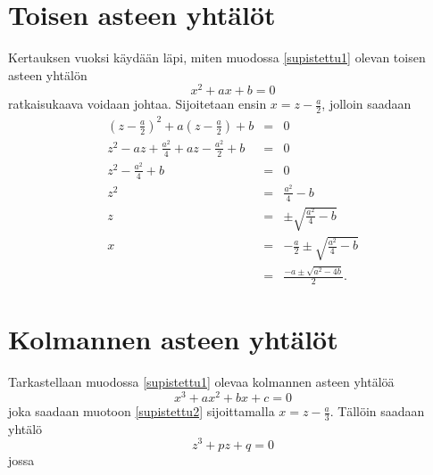 \documentclass[a4paper]{article}
\begin{document}
\section{Toisen asteen yhtälöt}
Kertauksen vuoksi käydään läpi, miten muodossa \ref{supistettu1} olevan toisen asteen yhtälön
$$
x^2+ax+b=0
$$
ratkaisukaava voidaan johtaa. Sijoitetaan ensin $x=z-\frac{a}{2}$, jolloin saadaan
\begin{eqnarray*}
  \left(z-\frac{a}{2}\right)^2+a\left(z-\frac{a}{2}\right)+b & = & 0 \\
  z^2-az+\frac{a^2}{4}+az-\frac{a^2}{2}+b & = & 0 \\
  z^2-\frac{a^2}{4}+b & = & 0 \\
  z^2 & = & \frac{a^2}{4}-b \\
  z & = & \pm\sqrt{\frac{a^2}{4}-b} \\
  x & = & -\frac{a}{2}\pm\sqrt{\frac{a^2}{4}-b} \\
  & = & \frac{-a\pm\sqrt{a^2-4b}}{2}.
\end{eqnarray*}
\section{Kolmannen asteen yhtälöt}
Tarkastellaan muodossa \ref{supistettu1} olevaa kolmannen asteen yhtälöä
$$
x^3+ax^2+bx+c=0
$$
joka saadaan muotoon \ref{supistettu2} sijoittamalla $x=z-\frac{a}{3}$. Tällöin saadaan yhtälö
$$
z^3+pz+q=0
$$
jossa
\end{document}
